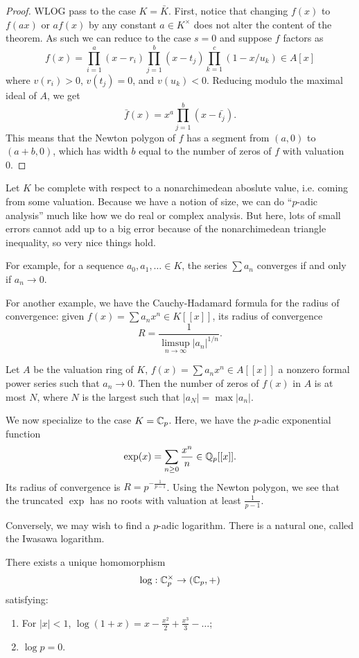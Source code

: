 \documentclass[11pt]{amsart}
\begin{document}
\begin{proof}
WLOG pass to the case $K = \bar{K}$. First, notice that changing $f(x)$ to $f(ax)$ or $af(x)$ by any constant $a\in K^{\times}$ does not alter the content of the theorem. As such we can reduce to the case $s = 0$ and suppose $f$ factors as
\[f(x) = \prod_{i=1}^{a} (x-r_i) \prod_{j=1}^{b} (x-t_j) \prod_{k=1}^{c} (1-x/u_k) \in A[x]\]
where $v(r_i) > 0$, $v(t_j) = 0$, and $v(u_k) < 0$. Reducing modulo the maximal ideal of $A$, we get
\[\bar{f}(x) = x^a\prod_{j=1}^b(x-\bar{t_j}).\]
This means that the Newton polygon of $f$ has a segment from $(a,0)$ to $(a+b,0)$, which has width $b$ equal to the number of zeros of $f$ with valuation 0.
\end{proof}


Let $K$ be complete with respect to a nonarchimedean aboslute value, i.e. coming from some valuation. Because we have a notion of size, we can do ``$p$-adic analysis'' much like how we do real or complex analysis. But here, lots of small errors cannot add up to a big error because of the nonarchimedean triangle inequality, so very nice things hold. 

For example, for a sequence $a_0,a_1,\dots\in K$, the series $\sum a_n$ converges if and only if $a_n\to 0$. 

For another example, we have the Cauchy-Hadamard formula for the radius of convergence: given $f(x) = \sum a_nx^n \in K[[x]]$, its radius of convergence
\[R = \frac{1}{\limsup_{n\to\infty} |a_n|^{1/n}}.\]

\begin{thm}
Let $A$ be the valuation ring of $K$, $f(x) = \sum a_nx^n \in A[[x]]$ a nonzero formal power series such that $a_n\to 0$. Then the number of zeros of $f(x)$ in $A$ is at most $N$, where $N$ is the largest such that $|a_N| = \max |a_n|$. 
\end{thm}

We now specialize to the case $K = \mathbb{C}_p$. Here, we have the $p$-adic exponential function
\[\exp(x) = \sum_{n\ge 0} \frac{x^n}{n} \in \mathbb{Q}_p[[x]].\]
Its radius of convergence is $R = p^{-\frac{1}{p-1}}$. Using the Newton polygon, we see that the truncated $\exp$ has no roots with valuation at least $\frac{1}{p-1}$.

Conversely, we may wish to find a $p$-adic logarithm. There is a natural one, called the Iwasawa logarithm.

\begin{prop}
There exists a unique homomorphism
\[\log: \mathbb{C}_p^{\times} \to (\mathbb{C}_p, +)\]
satisfying:
\begin{enumerate}
    \item For $|x| < 1$, $\log(1+x) = x - \frac{x^2}{2} + \frac{x^3}{3} -\dots$;
    \item $\log p = 0$.
\end{enumerate}
\end{prop}
\end{document}
